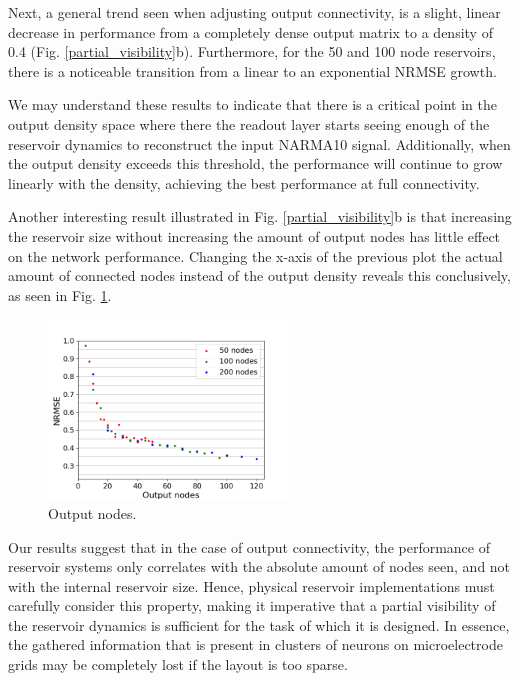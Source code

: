 Next, a general trend seen when adjusting output connectivity, is a slight,
linear decrease in performance from a completely dense output matrix to a
density of 0.4 (Fig. \ref{partial_visibility}b). Furthermore, for the 50 and 100
node reservoirs, there is a noticeable transition from a linear to an
exponential NRMSE growth.

We may understand these results to indicate that there is a critical point in
the output density space where there the readout layer starts seeing enough of
the reservoir dynamics to reconstruct the input NARMA10 signal. Additionally,
when the output density exceeds this threshold, the performance will continue to
grow linearly with the density, achieving the best performance at full
connectivity.

Another interesting result illustrated in Fig. \ref{partial_visibility}b is that
increasing the reservoir size without increasing the amount of output nodes has
little effect on the network performance. Changing the x-axis of the previous
plot the actual amount of connected nodes instead of the output density reveals
this conclusively, as seen in Fig. \ref{output_nodes}.

\begin{figure}[H]
  \centering
  \includegraphics[width=2.5in]{img/output_nodes.png}
  \caption{
    Output nodes.
  }
  \label{output_nodes}
\end{figure}

Our results suggest that in the case of output connectivity, the performance of
reservoir systems only correlates with the absolute amount of nodes seen, and
not with the internal reservoir size. Hence, physical reservoir implementations
must carefully consider this property, making it imperative that a partial
visibility of the reservoir dynamics is sufficient for the task of which it is
designed. In essence, the gathered information that is present in clusters of
neurons on microelectrode grids may be completely lost if the layout is too
sparse.



